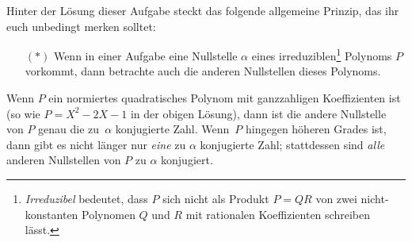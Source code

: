 Hinter der Lösung dieser Aufgabe steckt das folgende allgemeine Prinzip, das ihr euch unbedingt merken solltet:
\begin{enumerate}\itshape
	\item[$(*)$] Wenn in einer Aufgabe eine Nullstelle $\alpha$ eines irreduziblen\footnote{\emph{Irreduzibel} bedeutet, dass $P$ sich nicht als Produkt $P=QR$ von zwei nicht-konstanten Polynomen $Q$ und $R$ mit rationalen Koeffizienten schreiben lässt.} Polynoms $P$ vorkommt, dann betrachte auch die anderen Nullstellen dieses Polynoms.
\end{enumerate}
Wenn $P$ ein normiertes quadratisches Polynom mit ganzzahligen Koeffizienten ist (so wie $P=X^2-2X-1$ in der obigen Lösung), dann ist die andere Nullstelle von $P$ genau die zu~$\alpha$ konjugierte Zahl. Wenn~$P$ hingegen höheren Grades ist, dann gibt es nicht länger nur \emph{eine} zu $\alpha$ konjugierte Zahl; stattdessen sind \emph{alle} anderen Nullstellen von $P$ zu $\alpha$ konjugiert.

